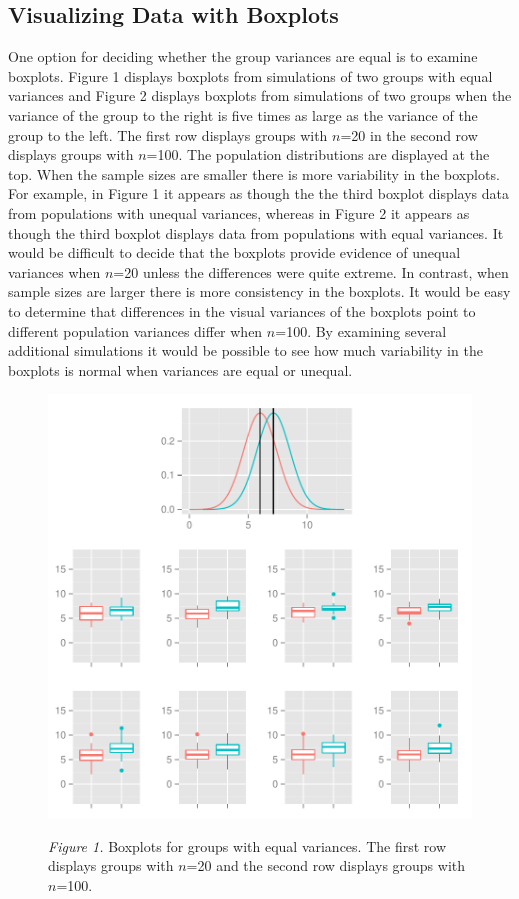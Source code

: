 \documentclass[man,a4paper,noextraspace,apacite]{apa6}
\begin{document}
\subsection{Visualizing Data with Boxplots} 
    One option for deciding whether the group variances are equal is to examine boxplots. Figure 1 displays boxplots from simulations of two groups with equal variances and Figure 2 displays boxplots from simulations of two groups when the variance of the group to the right is five times as large as the variance of the group to the left. The first row displays groups with $n$=20 in the second row displays groups with $n$=100. The population distributions are displayed at the top. When the sample sizes are smaller there is more variability in the boxplots. For example, in Figure 1 it appears as though the the third boxplot displays data from populations with unequal variances, whereas in Figure 2 it appears as though the third boxplot displays data from populations with equal variances. It would be difficult to decide that the boxplots provide evidence of unequal variances when $n$=20 unless the differences were quite extreme. In contrast, when sample sizes are larger there is more consistency in the boxplots. It would be easy to determine that differences in the visual variances of the boxplots point to different population variances differ when $n$=100. By examining several additional simulations it would be possible to see how much variability in the boxplots is normal when variances are equal or unequal.
   
\begin{figure}
\includegraphics{WelchManuscript-abridged-varEqualBoxplots}

\textit{Figure 1.} Boxplots for groups with equal variances. The first row displays groups with $n$=20 and the second row displays groups with $n$=100.
\end{figure}
\end{document}
